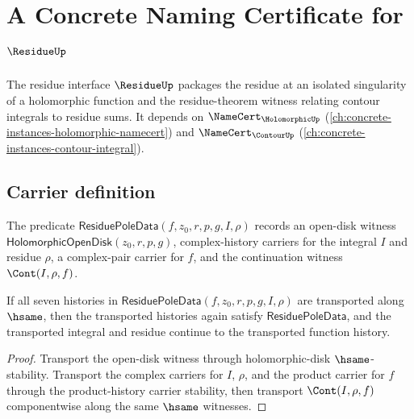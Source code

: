 \chapter{A Concrete Naming Certificate for $\ResidueUp$}
\label{ch:concrete-instances-residue-namecert}

The residue interface $\ResidueUp$ packages the residue at an isolated singularity of a holomorphic function and the residue-theorem witness relating contour integrals to residue sums. It depends on $\NameCert_{\HolomorphicUp}$ (\autoref{ch:concrete-instances-holomorphic-namecert}) and $\NameCert_{\ContourUp}$ (\autoref{ch:concrete-instances-contour-integral}).

\section{Carrier definition}
\label{sec:residue-carrier}

\begin{definition}
\label{def:residue-pole-data}
The predicate \(\mathsf{ResiduePoleData}(f,z_0,r,p,g,I,\rho)\) records an open-disk witness \(\mathsf{HolomorphicOpenDisk}(z_0,r,p,g)\), complex-history carriers for the integral \(I\) and residue \(\rho\), a complex-pair carrier for \(f\), and the continuation witness \(\Cont(I,\rho,f)\).
\end{definition}

\begin{theorem}
\label{thm:residue-pole-data-hsame-transport}
If all seven histories in \(\mathsf{ResiduePoleData}(f,z_0,r,p,g,I,\rho)\) are transported along \(\hsame\), then the transported histories again satisfy \(\mathsf{ResiduePoleData}\), and the transported integral and residue continue to the transported function history.
\end{theorem}
\begin{proof}
Transport the open-disk witness through holomorphic-disk \(\hsame\)-stability. Transport the complex carriers for \(I\), \(\rho\), and the product carrier for \(f\) through the product-history carrier stability, then transport \(\Cont(I,\rho,f)\) componentwise along the same \(\hsame\) witnesses.
\end{proof}

